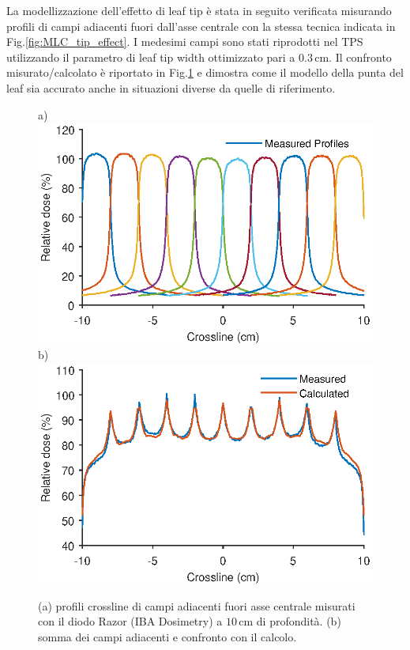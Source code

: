 La modellizzazione dell'effetto di leaf tip è stata in seguito verificata misurando profili di campi adiacenti fuori dall'asse centrale con la stessa tecnica indicata in Fig.\ref{fig:MLC_tip_effect}. I medesimi campi sono stati riprodotti nel TPS utilizzando il parametro di leaf tip width ottimizzato pari a $0.3\,$cm. Il confronto misurato/calcolato è riportato in Fig.\ref{fig:MLC_tip_model_offaxis} e dimostra come il modello della punta del leaf sia accurato anche in situazioni diverse da quelle di riferimento.
\begin{figure}[!t]
\centering
a)\includegraphics[width=.43\textwidth]{./cap2/MLC_Plots/Abutted/PlotMLC_Tip_modeling_offaxis.eps}
b)\includegraphics[width=.43\textwidth]{./cap2/MLC_Plots/Abutted/PlotMLC_Tip_modeling_offaxisSUM.eps}
\caption{(a) profili crossline di campi adiacenti fuori asse centrale misurati con il diodo Razor (IBA Dosimetry) a $10\,$cm di profondità. (b) somma dei campi adiacenti e confronto con il calcolo.}
\label{fig:MLC_tip_model_offaxis}
\end{figure}


